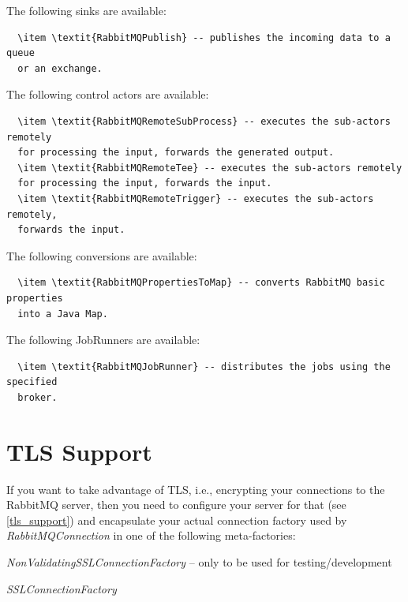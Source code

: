 \documentclass[a4paper]{book}
\begin{document}
The following sinks are available:
\begin{verbatim}
  \item \textit{RabbitMQPublish} -- publishes the incoming data to a queue
  or an exchange.
\end{verbatim}

The following control actors are available:
\begin{verbatim}
  \item \textit{RabbitMQRemoteSubProcess} -- executes the sub-actors remotely
  for processing the input, forwards the generated output.
  \item \textit{RabbitMQRemoteTee} -- executes the sub-actors remotely
  for processing the input, forwards the input.
  \item \textit{RabbitMQRemoteTrigger} -- executes the sub-actors remotely,
  forwards the input.
\end{verbatim}

The following conversions are available:
\begin{verbatim}
  \item \textit{RabbitMQPropertiesToMap} -- converts RabbitMQ basic properties
  into a Java Map.
\end{verbatim}

The following JobRunners are available:
\begin{verbatim}
  \item \textit{RabbitMQJobRunner} -- distributes the jobs using the specified
  broker.
\end{verbatim}

\section{TLS Support}
If you want to take advantage of TLS, i.e., encrypting your connections to
the RabbitMQ server, then you need to configure your server for that (see
\ref{tls_support}) and encapsulate your actual connection factory used by
\textit{RabbitMQConnection} in one of the following meta-factories:
\begin{tight_itemize}
  \item \textit{NonValidatingSSLConnectionFactory} -- only to be used for testing/development
  \item \textit{SSLConnectionFactory}
\end{tight_itemize}



\end{document}
